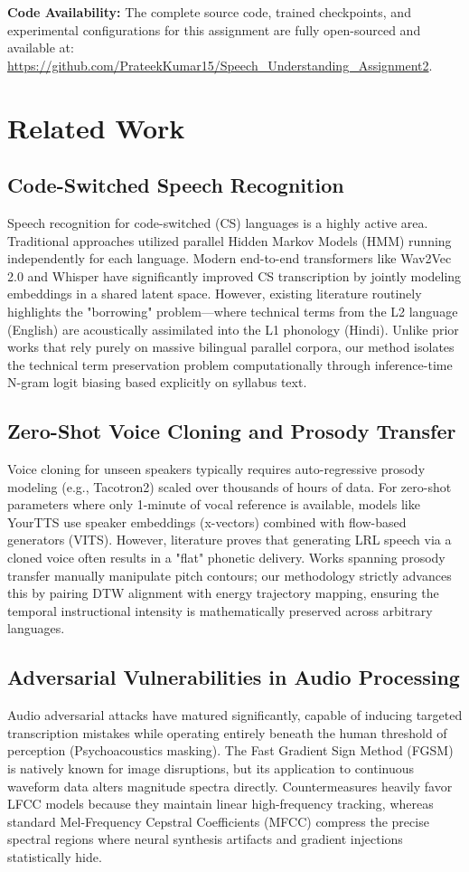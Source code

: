 \documentclass[10pt,conference]{IEEEtran}
\begin{document}
\textbf{Code Availability:} The complete source code, trained checkpoints, and experimental configurations for this assignment are fully open-sourced and available at: \url{https://github.com/PrateekKumar15/Speech_Understanding_Assignment2}.


\section{Related Work}

\subsection{Code-Switched Speech Recognition}
Speech recognition for code-switched (CS) languages is a highly active area. Traditional approaches utilized parallel Hidden Markov Models (HMM) running independently for each language. Modern end-to-end transformers like Wav2Vec 2.0 and Whisper have significantly improved CS transcription by jointly modeling embeddings in a shared latent space. However, existing literature routinely highlights the "borrowing" problem—where technical terms from the L2 language (English) are acoustically assimilated into the L1 phonology (Hindi). Unlike prior works that rely purely on massive bilingual parallel corpora, our method isolates the technical term preservation problem computationally through inference-time N-gram logit biasing based explicitly on syllabus text.

\subsection{Zero-Shot Voice Cloning and Prosody Transfer}
Voice cloning for unseen speakers typically requires auto-regressive prosody modeling (e.g., Tacotron2) scaled over thousands of hours of data. For zero-shot parameters where only 1-minute of vocal reference is available, models like YourTTS use speaker embeddings (x-vectors) combined with flow-based generators (VITS). However, literature proves that generating LRL speech via a cloned voice often results in a "flat" phonetic delivery. Works spanning prosody transfer manually manipulate pitch contours; our methodology strictly advances this by pairing DTW alignment with energy trajectory mapping, ensuring the temporal instructional intensity is mathematically preserved across arbitrary languages.

\subsection{Adversarial Vulnerabilities in Audio Processing}
Audio adversarial attacks have matured significantly, capable of inducing targeted transcription mistakes while operating entirely beneath the human threshold of perception (Psychoacoustics masking). The Fast Gradient Sign Method (FGSM) is natively known for image disruptions, but its application to continuous waveform data alters magnitude spectra directly. Countermeasures heavily favor LFCC models because they maintain linear high-frequency tracking, whereas standard Mel-Frequency Cepstral Coefficients (MFCC) compress the precise spectral regions where neural synthesis artifacts and gradient injections statistically hide.
\end{document}
